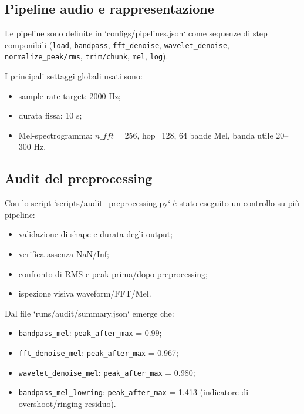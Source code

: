 \documentclass[a4paper,11pt]{article}
\begin{document}
\subsection*{Pipeline audio e rappresentazione}
Le pipeline sono definite in `configs/pipelines.json` come sequenze di step componibili (\texttt{load}, \texttt{bandpass}, \texttt{fft\_denoise}, \texttt{wavelet\_denoise}, \texttt{normalize\_peak/rms}, \texttt{trim/chunk}, \texttt{mel}, \texttt{log}).

I principali settaggi globali usati sono:
\begin{itemize}
  \item sample rate target: 2000 Hz;
  \item durata fissa: 10 s;
  \item Mel-spectrogramma: $n\_fft=256$, hop=128, 64 bande Mel, banda utile 20--300 Hz.
\end{itemize}

\subsection*{Audit del preprocessing}
Con lo script `scripts/audit_preprocessing.py` è stato eseguito un controllo su più pipeline:
\begin{itemize}
  \item validazione di shape e durata degli output;
  \item verifica assenza NaN/Inf;
  \item confronto di RMS e peak prima/dopo preprocessing;
  \item ispezione visiva waveform/FFT/Mel.
\end{itemize}

Dal file `runs/audit/summary.json` emerge che:
\begin{itemize}
  \item \texttt{bandpass\_mel}: \texttt{peak\_after\_max} = 0.99;
  \item \texttt{fft\_denoise\_mel}: \texttt{peak\_after\_max} = 0.967;
  \item \texttt{wavelet\_denoise\_mel}: \texttt{peak\_after\_max} = 0.980;
  \item \texttt{bandpass\_mel\_lowring}: \texttt{peak\_after\_max} = 1.413 (indicatore di overshoot/ringing residuo).
\end{itemize}
\end{document}
